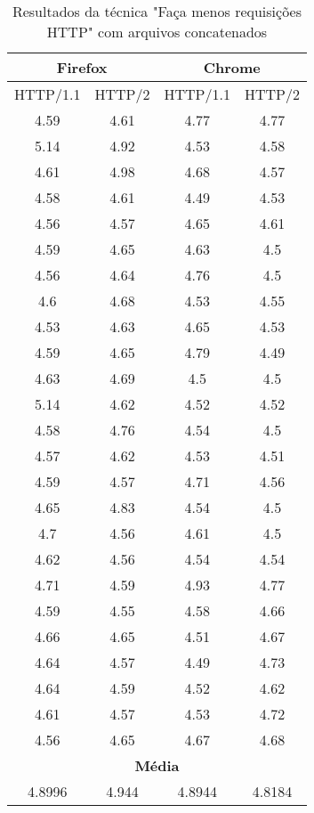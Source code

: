 \begin{table}[h]
	\centering
	\caption{Resultados da técnica "Faça menos requisições HTTP" com arquivos concatenados}
	\label{resultados-facamenosrequisicoeshttp-concatenados}
	\begin{tabular}{cccc}
		\hline
		\multicolumn{2}{c}{\textbf{Firefox}} & \multicolumn{2}{c}{\textbf{Chrome}} \\
		\hline
		HTTP/1.1 & HTTP/2 & HTTP/1.1 & HTTP/2 \\
		\hline
		4.59 & 4.61 & 4.77 & 4.77 \\
		5.14 & 4.92 & 4.53 & 4.58 \\
		4.61 & 4.98 & 4.68 & 4.57 \\
		4.58 & 4.61 & 4.49 & 4.53 \\
		4.56 & 4.57 & 4.65 & 4.61 \\
		4.59 & 4.65 & 4.63 & 4.5  \\
		4.56 & 4.64 & 4.76 & 4.5  \\
		4.6  & 4.68 & 4.53 & 4.55 \\
		4.53 & 4.63 & 4.65 & 4.53 \\
		4.59 & 4.65 & 4.79 & 4.49 \\
		4.63 & 4.69 & 4.5  & 4.5  \\
		5.14 & 4.62 & 4.52 & 4.52 \\
		4.58 & 4.76 & 4.54 & 4.5  \\
		4.57 & 4.62 & 4.53 & 4.51 \\
		4.59 & 4.57 & 4.71 & 4.56 \\
		4.65 & 4.83 & 4.54 & 4.5  \\
		4.7  & 4.56 & 4.61 & 4.5  \\
		4.62 & 4.56 & 4.54 & 4.54 \\
		4.71 & 4.59 & 4.93 & 4.77 \\
		4.59 & 4.55 & 4.58 & 4.66 \\
		4.66 & 4.65 & 4.51 & 4.67 \\
		4.64 & 4.57 & 4.49 & 4.73 \\
		4.64 & 4.59 & 4.52 & 4.62 \\
		4.61 & 4.57 & 4.53 & 4.72 \\
		4.56 & 4.65 & 4.67 & 4.68 \\
		\hline
		\multicolumn{4}{c}{\textbf{Média}} \\
		4.8996 & 4.944 & 4.8944 & 4.8184 \\
		\hline
	\end{tabular}
\end{table}